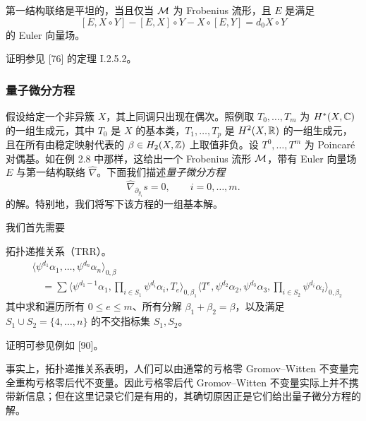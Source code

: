 
\begin{theorem}
第一结构联络是平坦的，当且仅当 $\mathcal{M}$ 为 Frobenius 流形，且 $E$ 是满足
\[
[E,X\circ Y]-[E,X]\circ Y-X\circ[E,Y]=d_0X\circ Y
\]
的 Euler 向量场。
\end{theorem}

证明参见 [76] 的定理 I.2.5.2。

\subsubsection{量子微分方程}

假设给定一个非异簇 $X$，其上同调只出现在偶次。照例取 $T_0,\dots,T_m$ 为 $H^*(X,\mathbb{C})$ 的一组生成元，其中 $T_0$ 是 $X$ 的基本类，$T_1,\dots,T_p$ 是 $H^2(X,\mathbb{R})$ 的一组生成元，且在所有由稳定映射代表的 $\beta\in H_2(X,\mathbb{Z})$ 上取值非负。设 $T^0,\dots,T^m$ 为 Poincaré 对偶基。如在例 2.8 中那样，这给出一个 Frobenius 流形 $\mathcal{M}$，带有 Euler 向量场 $E$ 与第一结构联络 $\widehat{\nabla}$。下面我们描述\emph{量子微分方程}
\begin{equation}
\widehat{\nabla}_{\partial_{y_i}}s=0,\qquad i=0,\dots,m. \tag{2.8}
\end{equation}
的解。特别地，我们将写下该方程的一组基本解。

我们首先需要

\begin{proposition}
拓扑递推关系（TRR）。
\begin{align*}
&\langle\psi^{d_1}\alpha_1,\dots,\psi^{d_n}\alpha_n\rangle_{0,\beta}\\
&\quad=\sum\langle\psi^{d_1-1}\alpha_1,\prod_{i\in S_1}\psi^{d_i}\alpha_i,T_e\rangle_{0,\beta_1}\langle T^e,\psi^{d_2}\alpha_2,\psi^{d_3}\alpha_3,\prod_{i\in S_2}\psi^{d_i}\alpha_i\rangle_{0,\beta_2}
\end{align*}
其中求和遍历所有 $0\le e\le m$、所有分解 $\beta_1+\beta_2=\beta$，以及满足 $S_1\cup S_2=\{4,\dots,n\}$ 的不交指标集 $S_1,S_2$。
\end{proposition}

证明可参见例如 [90]。

\begin{remark}
事实上，拓扑递推关系表明，人们可以由通常的亏格零 Gromov–Witten 不变量完全重构亏格零后代不变量。因此亏格零后代 Gromov–Witten 不变量实际上并不携带新信息；但在这里记录它们是有用的，其确切原因正是它们给出量子微分方程的解。
\end{remark}

